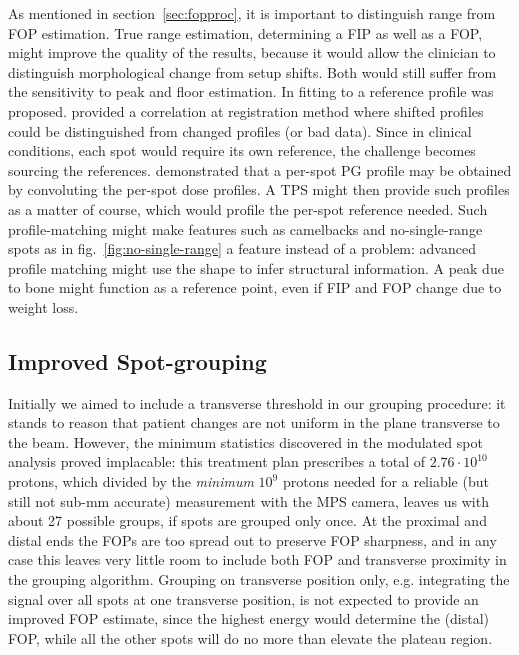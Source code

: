 \documentclass[a4paper,english]{article}
\begin{document}
As mentioned in section~\ref{sec:fopproc}, it is important to distinguish range from FOP estimation. True range estimation, determining a FIP as well as a FOP, might improve the quality of the results, because it would allow the clinician to distinguish morphological change from setup shifts. Both would still suffer from the sensitivity to peak and floor estimation. In \cite{Roellinghoff2014a} fitting to a reference profile was proposed. \cite{Gueth2013} provided a correlation at registration method where shifted profiles could be distinguished from changed profiles (or bad data). Since in clinical conditions, each spot would require its own reference, the challenge becomes sourcing the references. \cite{Schumann2016} demonstrated that a per-spot PG profile may be obtained by convoluting the per-spot dose profiles. A TPS might then provide such profiles as a matter of course, which would profile the per-spot reference needed. Such profile-matching might make features such as camelbacks and no-single-range spots as in fig.~\ref{fig:no-single-range} a feature instead of a problem: advanced profile matching might use the shape to infer structural information. A peak due to bone might function as a reference point, even if FIP and FOP change due to weight loss.

\subsection{Improved Spot-grouping}


Initially we aimed to include a transverse threshold in our grouping procedure: it stands to reason that patient changes are not uniform in the plane transverse to the beam. However, the minimum statistics discovered in the modulated spot analysis proved implacable: this treatment plan prescribes a total of $2.76\cdot10^{10}$ protons, which divided by the \emph{minimum} $10^9$ protons needed for a reliable (but still not sub-mm accurate) measurement with the MPS camera, leaves us with about 27 possible groups, if spots are grouped only once. At the proximal and distal ends the FOPs are too spread out to preserve FOP sharpness, and in any case this leaves very little room to include both FOP and transverse proximity in the grouping algorithm. Grouping on transverse position only, e.g. integrating the signal over all spots at one transverse position, is not expected to provide an improved FOP estimate, since the highest energy would determine the (distal) FOP, while all the other spots will do no more than elevate the plateau region.
\end{document}
